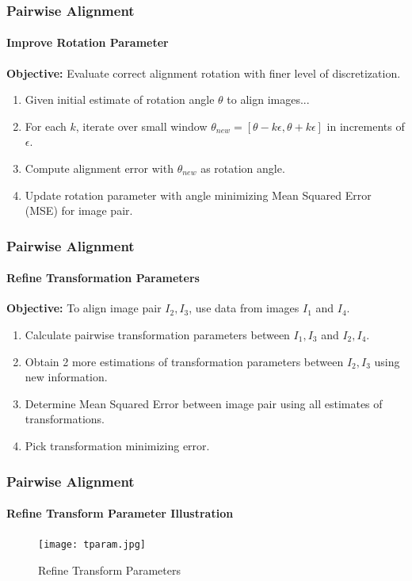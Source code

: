 \documentclass{beamer}
\begin{document}
\begin{frame}
\frametitle{Pairwise Alignment}
\framesubtitle{Improve Rotation Parameter} 
\textbf{Objective:} Evaluate correct alignment rotation with finer level of discretization. 
\begin{enumerate}
\item Given initial estimate of rotation angle $\theta$ to align images...
\item For each $k$, iterate over small window $\theta_{new} = [\theta-k\epsilon, \theta+k\epsilon]$ in increments of $\epsilon$.
\item Compute alignment error with $\theta_{new}$ as rotation angle.
\item Update rotation parameter with angle minimizing Mean Squared Error (MSE) for image pair.
\end{enumerate}
\end{frame}

\begin{frame}
\frametitle{Pairwise Alignment}
\framesubtitle{Refine Transformation Parameters}
\textbf{Objective:} To align image pair $I_2, I_3$, use data from images $I_1$ and $I_4$. \\
\begin{enumerate}
\item Calculate pairwise transformation parameters between $I_1,I_3$ and $I_2,I_4$.
\item Obtain 2 more estimations of transformation parameters between $I_2,I_3$ using new information.
\item Determine Mean Squared Error between image pair using all estimates of transformations.
\item Pick transformation minimizing error.
\end{enumerate}
\end{frame}

\begin{frame}
\frametitle{Pairwise Alignment}
\framesubtitle{Refine Transform Parameter Illustration}
\begin{figure}[p]
	\centering
	\texttt{[image: tparam.jpg]}
	\caption{Refine Transform Parameters}
\end{figure}
\end{frame}
\end{document}
